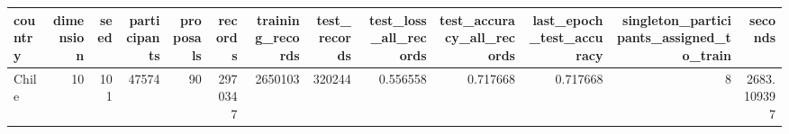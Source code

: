 \begin{tabular}{lrrrrrrrrrrrr}
\toprule
country & dimension & seed & participants & proposals & records & training_records & test_records & test_loss_all_records & test_accuracy_all_records & last_epoch_test_accuracy & singleton_participants_assigned_to_train & seconds \\
\midrule
Chile & 10 & 101 & 47574 & 90 & 2970347 & 2650103 & 320244 & 0.556558 & 0.717668 & 0.717668 & 8 & 2683.109397 \\
\bottomrule
\end{tabular}

